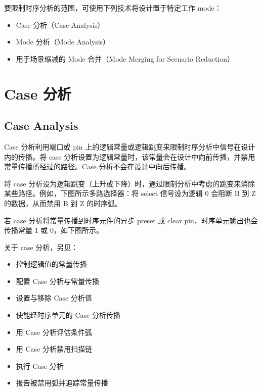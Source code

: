 \label{chap:case}

要限制时序分析的范围，可使用下列技术将设计置于特定工作 mode：
\begin{itemize}
  \item Case 分析（Case Analysis）
  \item Mode 分析（Mode Analysis）
  \item 用于场景缩减的 Mode 合并（Mode Merging for Scenario Reduction）
\end{itemize}

\section{Case 分析}
\subsection*{Case Analysis}

Case 分析利用端口或 pin 上的逻辑常量或逻辑跳变来限制时序分析中信号在设计内的传播。将 case 分析设置为逻辑常量时，该常量会在设计中向前传播，并禁用常量传播所经过的路径。Case 分析不会在设计中向后传播。

将 case 分析设为逻辑跳变（上升或下降）时，通过限制分析中考虑的跳变来消除某些路径。例如，下图所示多路选择器：将 select 信号设为逻辑 0 会阻断 B 到 Z 的数据，从而禁用 B 到 Z 的时序弧。


若 case 分析将常量传播到时序元件的异步 preset 或 clear pin，时序单元输出也会传播常量 1 或 0，如下图所示。


关于 case 分析，另见：
\begin{itemize}
  \item 控制逻辑值的常量传播
  \item 配置 Case 分析与常量传播
  \item 设置与移除 Case 分析值
  \item 使能经时序单元的 Case 分析传播
  \item 用 Case 分析评估条件弧
  \item 用 Case 分析禁用扫描链
  \item 执行 Case 分析
  \item 报告被禁用弧并追踪常量传播
\end{itemize}

